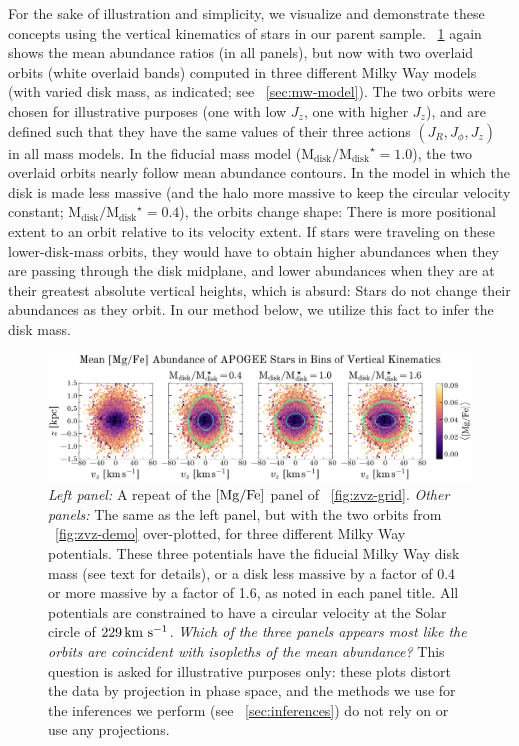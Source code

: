 \documentclass[modern]{aastex63}
\newcommand{\mdisk}{\ensuremath{\mathrm{M}_\mathrm{disk}}}
\newcommand{\mratio}{\ensuremath{\mdisk / \mdisk^\star}}
\begin{document}
For the sake of illustration and simplicity, we visualize and demonstrate these
concepts using the vertical kinematics of stars in our parent sample.
\figurename~\ref{fig:zvz-mgfe} again shows the mean  abundance
ratios (in all panels), but now with two overlaid orbits (white overlaid bands)
computed in three different Milky Way models (with varied disk mass, as
indicated; see \sectionname~\ref{sec:mw-model}).
The two orbits were chosen for illustrative purposes (one with low $J_z$, one
with higher $J_z$), and are defined such that they have the same values of their
three actions $(J_R, J_\phi, J_z)$ in all mass models.
In the fiducial mass model ($\mratio = 1.0$), the two overlaid orbits nearly
follow mean abundance contours.
In the model in which the disk is made less massive (and the halo more massive
to keep the circular velocity constant; $\mratio = 0.4$), the orbits change
shape:
There is more positional extent to an orbit relative to its velocity extent.
If stars were traveling on these lower-disk-mass orbits, they would have to
obtain higher abundances when they are passing through the disk midplane,
and lower abundances when they are at their greatest absolute vertical heights,
which is absurd: Stars do not change their abundances as they orbit.
In our method below, we utilize this fact to infer the disk mass.


\begin{figure}[!tp]
  \begin{mdframed}
    \color{captiongray}
  \begin{center}
  \includegraphics[width=\textwidth]{zvz-mean-MG_FE}
  \end{center}
  \caption{%
    \textsl{Left panel:} A repeat of the ${[\mathrm{Mg}/\mathrm{Fe}]}$ panel of
    \figurename~\ref{fig:zvz-grid}.
    \textsl{Other panels:} The same as the left panel, but with the two orbits
    from \figurename~\ref{fig:zvz-demo} over-plotted, for three different Milky
    Way potentials.
    These three potentials have the fiducial Milky Way disk mass (see text
    for details), or a disk less massive by a factor of 0.4 or more
    massive by a factor of 1.6, as noted in each panel title.
    All potentials are constrained to have a circular velocity at the
    Solar circle of $229\,\mathrm{km}~\mathrm{s}^{-1}$.
    \emph{Which of the three panels appears most like the orbits are
    coincident with isopleths of the mean abundance?}
    This question is asked for illustrative purposes only: these plots distort
    the data by projection in phase space, and the methods we use for the
    inferences we perform (see \sectionname~\ref{sec:inferences}) do not rely
    on or use any projections.
  \label{fig:zvz-mgfe}
  }
  \end{mdframed}
\end{figure}
\end{document}

